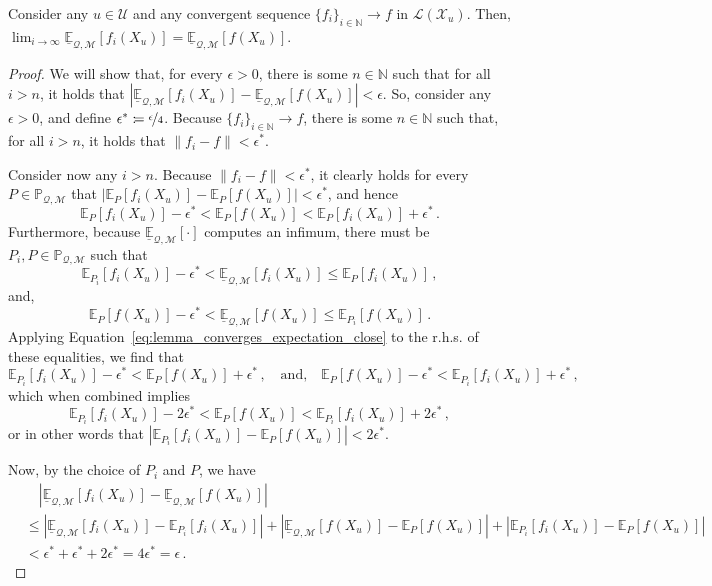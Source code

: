 \documentclass[twoside,11pt]{article}
\newcommand{\nats}{\mathbb{N}}
\newcommand{\states}{\mathcal{X}}
\newcommand{\lexp}{\underline{\mathbb{E}}_{\rateset,\mathcal{M}}}
\newcommand{\gambles}{\mathcal{L}}
\newcommand{\rateset}{\mathcal{Q}}
\newcommand{\norm}[1]{\left\lVert #1 \right\rVert}
\newcommand{\abs}[1]{\left\vert #1 \right\vert}
\newcommand{\coloneqq}{:\!=}
\begin{document}
\begin{lemma}\label{lemma:limit_lexp_is_lexp_limit}
Consider any $u\in\mathcal{U}$ and any convergent sequence $\{f_i\}_{i\in\nats}\to f$ in $\gambles(\states_u)$. Then, $\lim_{i\to\infty}\lexp[f_i(X_u)]=\lexp[f(X_u)]$.
\end{lemma}
\begin{proof}
We will show that, for every $\epsilon>0$, there is some $n\in\nats$ such that for all $i>n$, it holds that $\abs{\lexp[f_i(X_u)]-\lexp[f(X_u)]} < \epsilon$. So, consider any $\epsilon>0$, and define $\epsilon^*\coloneqq \nicefrac{\epsilon}{4}$. Because $\{f_i\}_{i\in\nats}\to f$, there is some $n\in\nats$ such that, for all $i>n$, it holds that $\norm{f_i - f}<\epsilon^*$. 

Consider now any $i>n$. Because $\norm{f_i - f}<\epsilon^*$, it clearly holds for every $P\in\mathbb{P}_{\rateset,\mathcal{M}}$ that $\abs{\mathbb{E}_P[f_i(X_u)] - \mathbb{E}_P[f(X_u)]}<\epsilon^*$, and hence
\begin{equation}\label{eq:lemma_converges_expectation_close}
\mathbb{E}_P[f_i(X_u)] - \epsilon^* < \mathbb{E}_P[f(X_u)] < \mathbb{E}_P[f_i(X_u)] + \epsilon^*\,.
\end{equation}
Furthermore, because $\lexp[\cdot]$ computes an infimum, there must be $P_i,P\in\mathbb{P}_{\rateset,\mathcal{M}}$ such that
\begin{equation*}
\mathbb{E}_{P_i}[f_i(X_u)] - \epsilon^* < \lexp[f_i(X_u)] \leq \mathbb{E}_{P}[f_i(X_u)]\,,
\end{equation*}
and,
\begin{equation*}
\mathbb{E}_{P}[f(X_u)] - \epsilon^* < \lexp[f(X_u)] \leq \mathbb{E}_{P_i}[f(X_u)]\,.
\end{equation*}
Applying Equation~\eqref{eq:lemma_converges_expectation_close} to the r.h.s. of these equalities, we find that
\begin{equation*}
\mathbb{E}_{P_i}[f_i(X_u)] - \epsilon^* < \mathbb{E}_{P}[f(X_u)] + \epsilon^*\,,\quad\text{and,}\quad \mathbb{E}_{P}[f(X_u)] - \epsilon^* < \mathbb{E}_{P_i}[f_i(X_u)] + \epsilon^*\,,
\end{equation*}
which when combined implies
\begin{equation*}
\mathbb{E}_{P_i}[f_i(X_u)] - 2\epsilon^* < \mathbb{E}_{P}[f(X_u)] < \mathbb{E}_{P_i}[f_i(X_u)] + 2\epsilon^*\,,
\end{equation*}
or in other words that $\abs{\mathbb{E}_{P_i}[f_i(X_u)] - \mathbb{E}_{P}[f(X_u)]} < 2\epsilon^*$.

Now, by the choice of $P_i$ and $P$, we have
\begin{align*}
 &\quad \abs{\lexp[f_i(X_u)]-\lexp[f(X_u)]} \\
 &\leq \abs{\lexp[f_i(X_u)] - \mathbb{E}_{P_i}[f_i(X_u)]} + \abs{\lexp[f(X_u)] - \mathbb{E}_{P}[f(X_u)]} + \abs{\mathbb{E}_{P_i}[f_i(X_u)] - \mathbb{E}_{P}[f(X_u)]} \\
 &< \epsilon^* + \epsilon^* + 2\epsilon^* = 4\epsilon^* = \epsilon\,.
\end{align*}
\end{proof}
\end{document}

